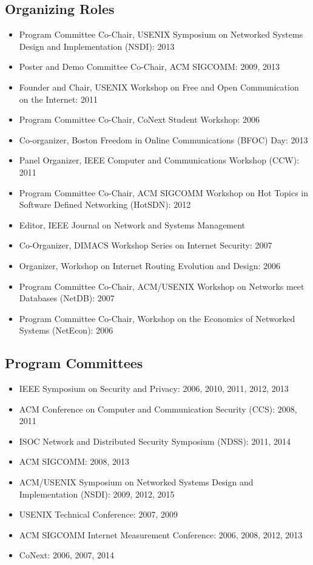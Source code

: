 \documentclass{article}
\begin{document}
\begin{cv}{}
\subsection*{Organizing Roles}
\begin{itemize}
\itemsep=-1pt
\item
Program Committee Co-Chair, USENIX Symposium on Networked Systems Design and Implementation (NSDI): 2013
\item
Poster and Demo Committee Co-Chair, ACM SIGCOMM: 2009, 2013
\item
Founder and Chair, USENIX Workshop on Free and Open Communication on the Internet: 2011
\item
Program Committee Co-Chair, CoNext Student Workshop: 2006
\item
Co-organizer, Boston Freedom in Online Communications (BFOC) Day: 2013
\item
Panel Organizer, IEEE Computer and Communications Workshop (CCW): 2011
\item
Program Committee Co-Chair, ACM SIGCOMM Workshop on Hot Topics in Software Defined Networking (HotSDN): 2012
\item
Editor, IEEE Journal on Network and Systems Management
\item
Co-Organizer, DIMACS Workshop Series on Internet Security: 2007
\item
Organizer, Workshop on Internet Routing Evolution and Design: 2006
\item Program Committee Co-Chair, ACM/USENIX Workshop on Networks meet Databases (NetDB): 2007 
\item Program Committee Co-Chair, Workshop on the Economics of Networked Systems (NetEcon): 2006
\end{itemize}

\subsection*{Program Committees}
\begin{itemize}
\itemsep=-1pt
\item
IEEE Symposium on Security and Privacy: 2006, 2010, 2011, 2012, 2013
\item
ACM Conference on Computer and Communication Security (CCS): 2008, 2011
\item
ISOC Network and Distributed Security Symposium (NDSS): 2011, 2014
\item
ACM SIGCOMM: 2008, 2013
\item
ACM/USENIX Symposium on Networked Systems Design and Implementation
(NSDI): 2009, 2012, 2015
\item
USENIX Technical Conference: 2007, 2009
\item
ACM SIGCOMM Internet Measurement Conference: 2006, 2008, 2012, 2013
\item
CoNext: 2006, 2007, 2014


\end{itemize}
\end{cv}
\end{document}
